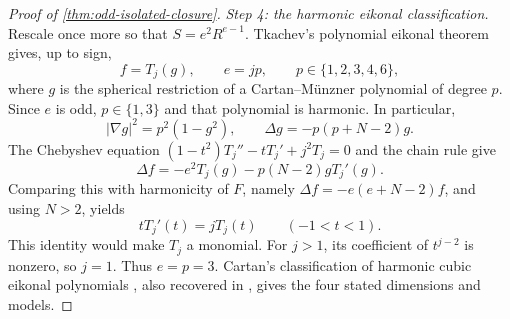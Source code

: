 \begin{proof}[Proof of \cref{thm:odd-isolated-closure}]
\emph{Step 4: the harmonic eikonal classification.}
Rescale once more so that \(S=e^2R^{e-1}\). Tkachev's polynomial
eikonal theorem \cite[Theorem~1]{TkachevIsoparametric14} gives, up to
sign,
\[
 f=T_j(g),\qquad e=jp,\qquad p\in\{1,2,3,4,6\},
\]
where \(g\) is the spherical restriction of a Cartan--M\"unzner
polynomial of degree \(p\). Since \(e\) is odd, \(p\in\{1,3\}\)
and that polynomial is harmonic. In particular,
\[
 |\nabla g|^2=p^2(1-g^2),\qquad
 \Delta g=-p(p+N-2)g.
\]
The Chebyshev equation
\((1-t^2)T_j''-tT_j'+j^2T_j=0\) and the chain rule give
\[
 \Delta f=-e^2T_j(g)-p(N-2)gT_j'(g).
\]
Comparing this with harmonicity of \(F\), namely
\(\Delta f=-e(e+N-2)f\), and using \(N>2\), yields
\[
 tT_j'(t)=jT_j(t)\qquad(-1<t<1).
\]
This identity would make \(T_j\) a monomial. For \(j>1\), its
coefficient of \(t^{j-2}\) is nonzero, so \(j=1\). Thus \(e=p=3\).
Cartan's classification of harmonic cubic eikonal polynomials
\cite{Cartan39}, also recovered in
\cite[Theorem~1.1]{TkachevCartan10}, gives the four stated
dimensions and models.
\end{proof}
